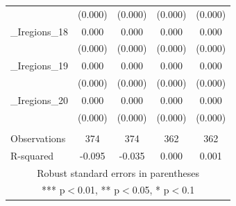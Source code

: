 \documentclass[]{article}
\begin{document}
\begin{tabular}{lcccc}
 & (0.000) & (0.000) & (0.000) & (0.000) \\
\_Iregions\_18 & 0.000 & 0.000 & 0.000 & 0.000 \\
 & (0.000) & (0.000) & (0.000) & (0.000) \\
\_Iregions\_19 & 0.000 & 0.000 & 0.000 & 0.000 \\
 & (0.000) & (0.000) & (0.000) & (0.000) \\
\_Iregions\_20 & 0.000 & 0.000 & 0.000 & 0.000 \\
 & (0.000) & (0.000) & (0.000) & (0.000) \\
 &  &  &  &  \\
Observations & 374 & 374 & 362 & 362 \\
 R-squared & -0.095 & -0.035 & 0.000 & 0.001 \\ \hline
\multicolumn{5}{c}{ Robust standard errors in parentheses} \\
\multicolumn{5}{c}{ *** p$<$0.01, ** p$<$0.05, * p$<$0.1} \\
\end{tabular}
\end{document}
